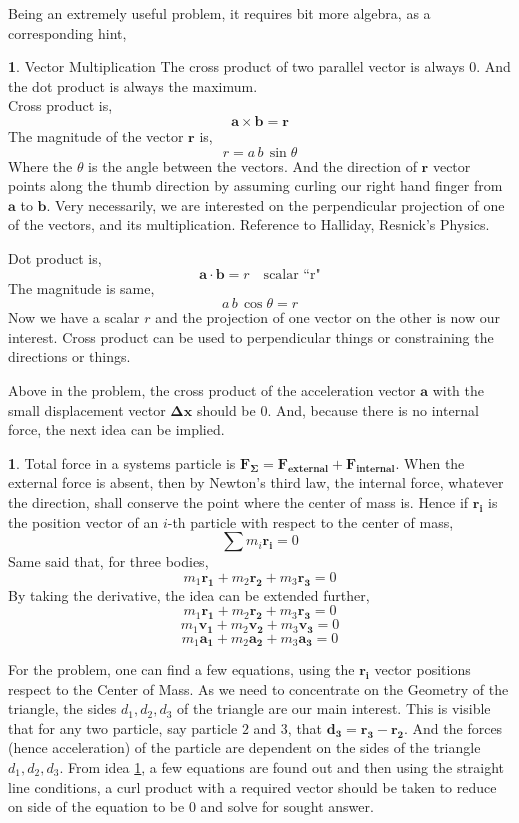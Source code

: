 \documentclass[11pt,a4paper,twocolumn,openright]{article}
\renewcommand{\vec}[1]{\boldsymbol{#1}}
\theoremstyle{definition}
\newtheorem{fct}{ \framebox[0.05\textwidth]{{\sffamily Fact}} }
\theoremstyle{definition}
\theoremstyle{definition}
\newtheorem{idea}{ \framebox[0.05\textwidth]{{\sffamily Idea}} }
\theoremstyle{definition}
\begin{document}
Being an extremely useful problem, it requires bit more algebra, as a corresponding hint, 
\begin{fct} \textsf{Vector Multiplication}
The cross product of two parallel vector is always 0. And the dot product is always the maximum. \\
Cross product is,
\[ \vec{a} \times \vec{b} = \vec{r} \]
The magnitude of the vector $\vec{r}$ is,
\[ r = a \, b \, \sin \theta \]
Where the $\theta$ is the angle between the vectors. And the direction of $\vec{r}$ vector points along the thumb direction by assuming curling our right hand finger from $\vec{a}$ to $\vec{b}$. Very necessarily, we are interested on the perpendicular projection of one of the vectors, and its multiplication. Reference to Halliday, Resnick's Physics.


Dot product is,
\[ \vec{a} \cdot \vec{b} = r \quad \text{scalar ``r"} \]
The magnitude is same,
\[ a \, b \, \cos \theta = r \]
Now we have a scalar $r$ and the projection of one vector on the other is now our interest.
%
Cross product can be used to perpendicular things or constraining the directions or things.

\end{fct}

Above in the problem, the cross product of the acceleration vector $\vec{a}$ with the small displacement vector $\vec{\Delta x}$ should be $0$. And, because there is no internal force, the next idea can be implied.

\begin{idea} \label{centerofmass}
Total force in a systems particle is $ \vec{F_{\Sigma}}  = \vec{F_{external}} + \vec{F_{internal}}$. When the external force is absent, then by Newton's third law, the internal force, whatever the direction, shall conserve the point where the center of mass is. Hence if $\vec{r_i}$ is the position vector of an $i$-th particle with respect to the center of mass,
\[ \sum m_i \vec{r_i} = 0 \]
Same said that, for three bodies, 
\[ m_1 \vec{r_1} + m_2 \vec{r_2} + m_3 \vec{r_3} = 0 \]
By taking the derivative, the idea can be extended further,
\[ m_1 \vec{r_1} + m_2 \vec{r_2} + m_3 \vec{r_3} = 0 \]
\[ m_1 \vec{v_1} + m_2 \vec{v_2} + m_3 \vec{v_3} = 0 \]
\[ m_1 \vec{a_1} + m_2 \vec{a_2} + m_3 \vec{a_3} = 0 \]
\end{idea}

For the problem, one can find a few equations, using the $\vec{r_i}$ vector positions respect to the Center of Mass. As we need to concentrate on the Geometry of the triangle, the sides $d_1,d_2,d_3$ of the triangle are our main interest. This is visible that for any two particle, say particle $2$ and $3$, that $\vec{d_3} = \vec{r_3} - \vec{r_2}$. And the forces (hence acceleration) of the particle are dependent on the sides of the triangle $d_1,d_2,d_3$. From idea \ref{centerofmass}, a few equations are found out and then using the straight line conditions, a curl product with a required vector should be taken to reduce on side of the equation to be 0 and solve for sought answer. 
\end{document}
